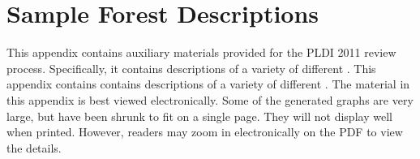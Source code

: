 \ifanon



% 
% 





\fi

\section{Sample Forest Descriptions}
\ifanon
This appendix contains auxiliary materials provided for the PLDI 2011
review process. Specifically, it contains \forest{} descriptions of a
variety of different \filestores{}.
\else
This appendix contains contains \forest{} descriptions of a
variety of different \filestores{}.
\fi
The material in this appendix is best viewed electronically.  Some of
the generated graphs are very large, but have been shrunk to fit on a
single page.  They will not display well when printed.  However,
readers may zoom in electronically on the PDF to view the details.


